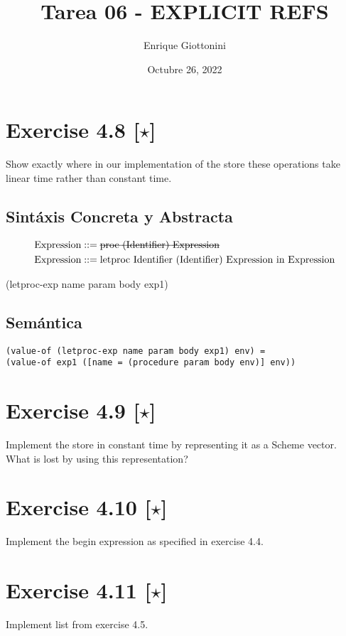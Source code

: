 \documentclass[11pt]{article}
\title{ Tarea 06 - EXPLICIT REFS}
\author{ Enrique Giottonini }
\date{Octubre 26, 2022}
\begin{document}
\maketitle	

\section*{Exercise 4.8 [$\star$]}
Show exactly where in our implementation of the store these operations take linear time rather than constant time.

\subsection*{Sintáxis Concreta y Abstracta}
\begin{align*}
\text{Expression} &::=  \text{\sout{proc (Identifier) Expression}} \\
\text{Expression}	&::= \text{letproc Identifier (Identifier) Expression in Expression}
\end{align*}

\begin{center}
(letproc-exp name param body exp1)
\end{center}

\subsection*{Semántica}

\begin{lstlisting}
(value-of (letproc-exp name param body exp1) env) =
(value-of exp1 ([name = (procedure param body env)] env))
\end{lstlisting}

\section*{Exercise 4.9 [$\star$]}
Implement the store in constant time by representing it as a Scheme
vector. What is lost by using this representation?

\section*{Exercise 4.10 [$\star$]}
Implement the begin expression as speciﬁed in exercise 4.4.

\section*{Exercise 4.11 [$\star$]}
Implement list from exercise 4.5.
\end{document}

